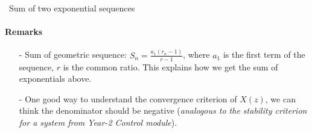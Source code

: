 \begin{ex}{ \ Sum of two exponential sequences}
    \paragraph{Remarks}
    \begin{itemize}
        \item[-] Sum of geometric sequence: $\displaystyle S_{n} = \frac{a_{1}(r_n - 1)}{r-1}$, where $a_1$ is the first term of the sequence, $r$ is the common ratio. This explains how we get the sum of exponentials above.

        \item[-] One good way to understand the convergence criterion of $X(z)$, we can think the denominator should be negative (\textit{analogous to the stability criterion for a system from Year-2 Control module}).  
    \end{itemize}
\end{ex}

